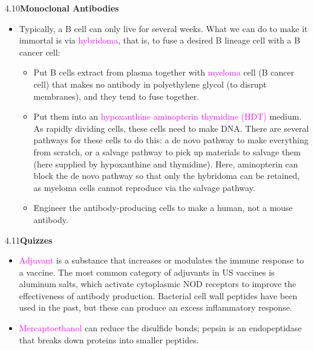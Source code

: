 \documentclass[UTF8]{book}
\newcommand{\pink}[1]{\textcolor{magenta}{#1}}
\begin{document}
4.10\quad \textbf{Monoclonal Antibodies}
\begin{itemize}
\item Typically, a B cell can only live for several weeks. What we can do to make it immortal is via \pink{hybridoma}, that is, to fuse a desired B lineage cell with a B cancer cell:
\begin{itemize}
	\item Put B cells extract from plasma together with \pink{myeloma} cell (B cancer cell) that makes no antibody in polyethylene glycol (to disrupt membranes), and they tend to fuse together.
	\item Put them into an \pink{hypoxanthine aminopterin thymidine (HDT)} medium. As rapidly dividing cells, these cells need to make DNA. There are several pathways for these cells to do this: a de novo pathway to make everything from scratch, or a salvage pathway to pick up materials to salvage them (here supplied by hypoxanthine and thymidine). Here, aminopterin can block the de novo pathway so that only the hybridoma can be retained, as myeloma cells cannot reproduce via the salvage pathway.
	\item Engineer the antibody-producing cells to make a human, not a mouse antibody.
\end{itemize}
\end{itemize}
4.11\quad \textbf{Quizzes}
\begin{itemize}
\item \pink{Adjuvant} is a substance that increases or modulates the immune response to a vaccine. The most common category of adjuvants in US vaccines is aluminum salts, which activate cytoplasmic NOD receptors to improve the effectiveness of antibody production. Bacterial cell wall peptides have been used in the past, but these can produce an excess inflammatory response.
\item \pink{Mercaptoethanol} can reduce the disulfide bonds; pepsin is an endopeptidase that breaks down proteins into smaller peptides.
\end{itemize}
\end{document}
